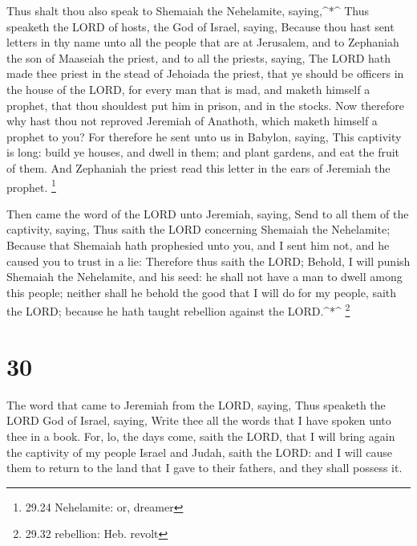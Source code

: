  Thus shalt thou also speak to Shemaiah the Nehelamite,
saying,\^{}*\^{}  Thus speaketh the LORD of hosts, the God
of Israel, saying, Because thou hast sent letters in thy name unto all
the people that are at Jerusalem, and to Zephaniah the son of Maaseiah
the priest, and to all the priests, saying,  The LORD hath
made thee priest in the stead of Jehoiada the priest, that ye should be
officers in the house of the LORD, for every man that is mad, and maketh
himself a prophet, that thou shouldest put him in prison, and in the
stocks.  Now therefore why hast thou not reproved Jeremiah
of Anathoth, which maketh himself a prophet to you?  For
therefore he sent unto us in Babylon, saying, This captivity is long:
build ye houses, and dwell in them; and plant gardens, and eat the fruit
of them.  And Zephaniah the priest read this letter in the
ears of Jeremiah the prophet. \footnote{29.24 Nehelamite: or, dreamer}

 Then came the word of the LORD unto Jeremiah, saying,
 Send to all them of the captivity, saying, Thus saith the
LORD concerning Shemaiah the Nehelamite; Because that Shemaiah hath
prophesied unto you, and I sent him not, and he caused you to trust in a
lie:  Therefore thus saith the LORD; Behold, I will punish
Shemaiah the Nehelamite, and his seed: he shall not have a man to dwell
among this people; neither shall he behold the good that I will do for
my people, saith the LORD; because he hath taught rebellion against the
LORD.\^{}*\^{} \footnote{29.32 rebellion: Heb. revolt}

\hypertarget{section-29}{%
\section{30}\label{section-29}}

 The word that came to Jeremiah from the LORD, saying,
 Thus speaketh the LORD God of Israel, saying, Write thee
all the words that I have spoken unto thee in a book.  For,
lo, the days come, saith the LORD, that I will bring again the captivity
of my people Israel and Judah, saith the LORD: and I will cause them to
return to the land that I gave to their fathers, and they shall possess
it.

